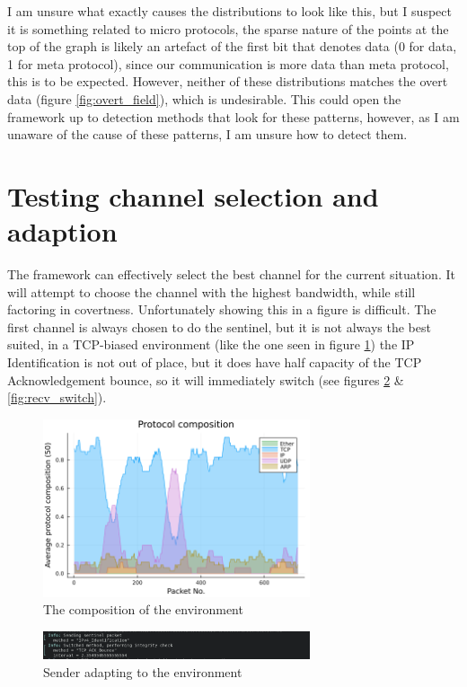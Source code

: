 I am unsure what exactly causes the distributions to look like this, but I suspect it is something related to micro protocols, the sparse nature of the points at the top of the graph is likely an artefact of the first bit that denotes data (0 for data, 1 for meta protocol), since our communication is more data than meta protocol, this is to be expected. However, neither of these distributions matches the overt data (figure \ref{fig:overt_field}), which is undesirable. This could open the framework up to detection methods that look for these patterns, however, as I am unaware of the cause of these patterns, I am unsure how to detect them.

\section{Testing channel selection and adaption}
\label{sec:channel_selection_and_adaption}

The framework can effectively select the best channel for the current situation. It will attempt to choose the channel with the highest bandwidth, while still factoring in covertness. Unfortunately showing this in a figure is difficult. The first channel is always chosen to do the sentinel, but it is not always the best suited, in a TCP-biased environment (like the one seen in figure \ref{fig:env_composition}) the IP Identification is not out of place, but it does have half capacity of the TCP Acknowledgement bounce, so it will immediately switch (see figures \ref{fig:send_switch} \& \ref{fig:recv_switch}).

\begin{figure}[h]
    \centering
    \includegraphics[width=0.7\textwidth]{fig/environment_composition.png}
    \caption{The composition of the environment}
    \label{fig:env_composition}
\end{figure}

\begin{figure}[h]
    \centering
    \includegraphics[width=0.7\textwidth]{fig/sender_adapt.png}
    \caption{Sender adapting to the environment}
    \label{fig:send_switch}
\end{figure}

